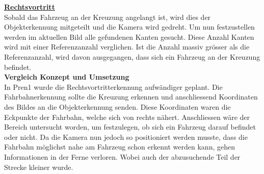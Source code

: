 \underline{\textbf{Rechtsvortritt}}\\[0.2cm]
Sobald das Fahrzeug an der Kreuzung angelangt ist, wird dies der Objekterkennung mitgeteilt und die Kamera wird gedreht. Um nun festzustellen werden im aktuellen Bild alle gefundenen Kanten gesucht. Diese Anzahl Kanten wird mit einer Referenzanzahl verglichen. Ist die Anzahl massiv grösser als die Referenzanzahl, wird davon ausgegangen, dass sich ein Fahrzeug an der Kreuzung befindet.\\[0.2cm]
\textbf{Vergleich Konzept und Umsetzung}\\[0.2cm]
In Pren1 wurde die Rechtsvortritterkennung aufwändiger geplant. Die Fahrbahnerkennung sollte die Kreuzung erkennen und anschliessend Koordinaten des Bildes an die Objekterkennung senden. Diese Koordinaten waren die Eckpunkte der Fahrbahn, welche sich von rechts nähert. Anschliessen wäre der Bereich untersucht worden, um festzulegen, ob sich ein Fahrzeug darauf befindet oder nicht. Da die Kamera nun jedoch so positioniert werden musste, dass die Fahrbahn möglichst nahe am Fahrzeug schon erkennt werden kann, gehen Informationen in der Ferne verloren. Wobei auch der abzusuchende Teil der Strecke kleiner wurde.

